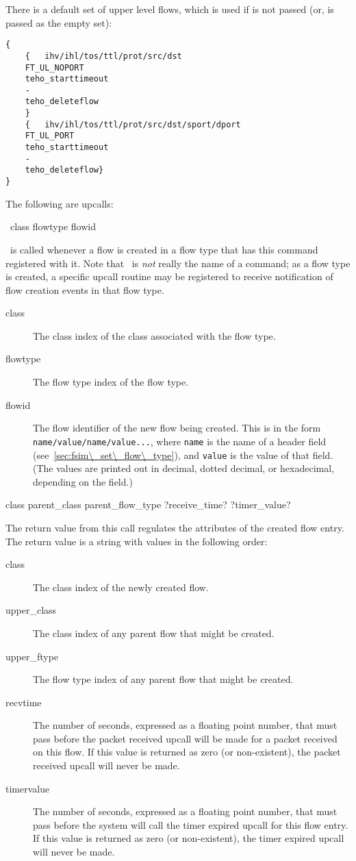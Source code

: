 \documentclass{article}
\begin{document}
There is a default set of upper level flows, which is used if
 is not passed (or, is passed as the empty set):
\begin{verbatim}
{
    {   ihv/ihl/tos/ttl/prot/src/dst
	FT_UL_NOPORT
	teho_starttimeout
	-
	teho_deleteflow
    }
    {	ihv/ihl/tos/ttl/prot/src/dst/sport/dport
	FT_UL_PORT
	teho_starttimeout
	-
	teho_deleteflow}
}
\end{verbatim}

\manend

The following are upcalls:


\SYNOPSIS \cmdname\ class flowtype flowid

\DESCRIPTION

\cmdname\ is called whenever a flow is created in a flow type that has
this command registered with it.  Note that \cmdname\ is \emph{not}
really the name of a command; as a flow type is created, a specific upcall
routine may be registered to receive notification of flow creation
events in that flow type.

\begin{description}
\item[class] The class index of the class associated with the flow type.
\item[flowtype] The flow type index of the flow type.
\item[flowid] The flow identifier of the new flow being created.  This
is in the form \texttt{name/value/name/value...}, where \texttt{name}
is the name of a header field (see~\ref{sec:fsim\_set\_flow\_type}),
and \texttt{value} is the value of that field.  (The values are printed
out in decimal, dotted decimal, or hexadecimal, depending on the
field.)
\end{description}

\RETURNVALUES class parent_class parent_flow_type ?receive_time?
?timer_value?

\RETURNDESC
The return value from this call regulates the attributes of the created
flow entry.  The return value is a string with values in the following
order:

\begin{description}
\item[class] The class index of the newly created flow.
\item[upper_class] The class index of any parent flow that might be created.
\item[upper_ftype] The flow type index of any parent flow that might be
created.
\item[recvtime] The number of seconds, expressed as a floating point
number, that must pass before the packet received upcall will be made
for a packet received on this flow.  If this value is returned as zero
(or non-existent), the packet received upcall will never be made.
\item[timervalue] The number of seconds, expressed as a floating point
number, that must pass before the system will call the timer expired
upcall for this flow entry.  If this value is returned as zero
(or non-existent), the timer expired upcall will never be made.
\end{description}
\end{document}
